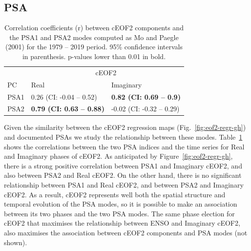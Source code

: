 \documentclass[smallextended]{svjour3}       %
\begin{document}
\hypertarget{psa}{%
\subsection{PSA}\label{psa}}



\begin{table}

\caption{\label{tab:psa-eof2}Correlation coefficients (r) between cEOF2 components and the PSA1 and PSA2 modes computed as Mo and Paegle (2001) for the 1979 -- 2019 period. 95\% confidence intervals in parenthesis. p-values lower than 0.01 in bold.}
\centering
\begin{tabular}[t]{l>{}l>{}l}
\toprule
\multicolumn{1}{c}{} & \multicolumn{2}{c}{cEOF2} \\
\cmidrule(l{3pt}r{3pt}){2-3}
PC & Real & Imaginary\\
\midrule
PSA1 & 0.26 (CI: -0.04 -- 0.52) & \textbf{0.82 (CI: 0.69 -- 0.9)}\\
PSA2 & \textbf{0.79 (CI: 0.63 -- 0.88)} & -0.02 (CI: -0.32 -- 0.29)\\
\bottomrule
\end{tabular}
\end{table}

Given the similarity between the cEOF2 regression maps (Fig.~\ref{fig:eof2-regr-gh}) and documented PSAs we study the relationship between these modes.
Table~\ref{tab:psa-eof2} shows the correlations between the two PSA indices and the time series for Real and Imaginary phases of cEOF2.
As anticipated by Figure~\ref{fig:eof2-regr-gh}, there is a strong positive correlation between PSA1 and Imaginary cEOF2, and also between PSA2 and Real cEOF2.
On the other hand, there is no significant relationship between PSA1 and Real cEOF2, and between PSA2 and Imaginary cEOF2.
As a result, cEOF2 represents well both the spatial structure and temporal evolution of the PSA modes, so it is possible to make an association between its two phases and the two PSA modes.
The same phase election for cEOF2 that maximises the relationship between ENSO and Imaginary cEOF2, also maximises the association between cEOF2 components and PSA modes (not shown).
\end{document}
